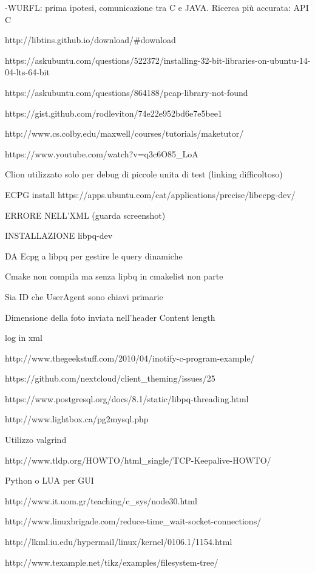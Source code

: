 \documentclass[paper=a4, oneside, fontsize=14pt, titlepage]{article}
\begin{document}
	\begin{flushleft}
		-WURFL: prima ipotesi, comunicazione tra C e JAVA. Ricerca più accurata: API C
		
		http://libtins.github.io/download/\#download
		
		https://askubuntu.com/questions/522372/installing-32-bit-libraries-on-ubuntu-14-04-lts-64-bit
		
		https://askubuntu.com/questions/864188/pcap-library-not-found
		
		https://gist.github.com/rodleviton/74e22e952bd6e7e5bee1
		
		http://www.cs.colby.edu/maxwell/courses/tutorials/maketutor/
		
		https://www.youtube.com/watch?v=q3c6O85\_LoA
		
		Clion utilizzato solo per debug di piccole unita di test (linking difficoltoso)
		
		ECPG install	https://apps.ubuntu.com/cat/applications/precise/libecpg-dev/
		
		ERRORE NELL'XML (guarda screenshot)
		
		INSTALLAZIONE libpq-dev
		
		DA Ecpg a libpq per gestire le query dinamiche
		
		Cmake non compila ma senza lipbq in cmakelist non parte
		
		Sia ID che UserAgent sono chiavi primarie
		
		Dimensione della foto inviata nell'header Content length
		
		log in xml
		
		http://www.thegeekstuff.com/2010/04/inotify-c-program-example/
		
		https://github.com/nextcloud/client\_theming/issues/25
		
		https://www.postgresql.org/docs/8.1/static/libpq-threading.html
		
		http://www.lightbox.ca/pg2mysql.php
		
		Utilizzo valgrind
		
		http://www.tldp.org/HOWTO/html\_single/TCP-Keepalive-HOWTO/
		
		Python o LUA per GUI
		
		http://www.it.uom.gr/teaching/c\_sys/node30.html
		
		http://www.linuxbrigade.com/reduce-time\_wait-socket-connections/
		
		http://lkml.iu.edu/hypermail/linux/kernel/0106.1/1154.html
		
		http://www.texample.net/tikz/examples/filesystem-tree/
	\end{flushleft}
	
\end{document}
